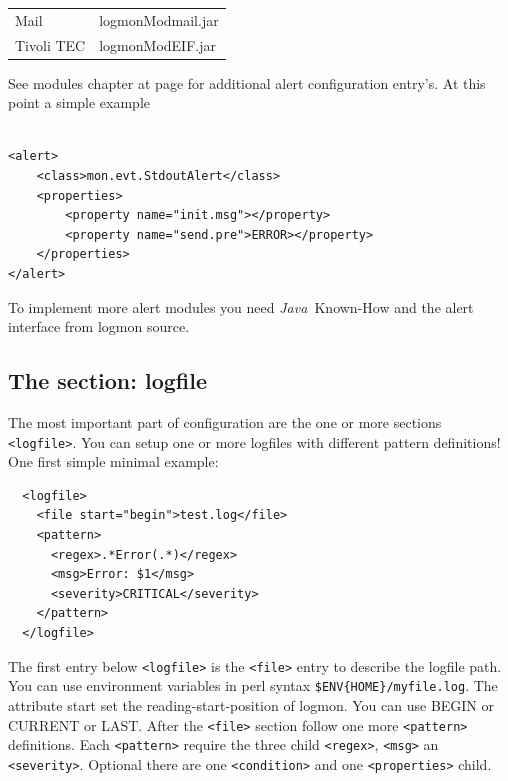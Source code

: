 \documentclass[11pt,a4paper]{article}
\newcommand{\java}{\textit{Java\ }}
\begin{document}
\bigskip
\begin{tabular}{ll}
  Mail 	     & logmonModmail.jar\\[1ex]
  Tivoli TEC & logmonModEIF.jar\\
\end{tabular}
\bigskip

See modules chapter at page \pageref{sec:modules} for additional alert
configuration entry's. At this point a simple example

\begin{samepage}
\begin{verbatim}

<alert>
    <class>mon.evt.StdoutAlert</class>
    <properties>
        <property name="init.msg"></property>
        <property name="send.pre">ERROR></property>
    </properties>
</alert>

\end{verbatim}
\end{samepage}

To implement more alert modules you need \java Known-How and the alert interface
from logmon source.

\subsection{The section: logfile}

The most important part of configuration are the one or more sections \verb#<logfile>#. You can
setup one or more logfiles with different pattern definitions! One first simple minimal example:

\begin{samepage}
\label{ex:logfile1}
\begin{verbatim}
  <logfile>
    <file start="begin">test.log</file>
    <pattern>
      <regex>.*Error(.*)</regex>
      <msg>Error: $1</msg>
      <severity>CRITICAL</severity>
    </pattern>
  </logfile>
\end{verbatim}
\end{samepage}

The first entry below \verb#<logfile># is the \verb#<file># entry to describe
the logfile path. You can use environment variables in perl syntax
\verb#$ENV{HOME}/myfile.log#. The attribute start set the reading-start-position
of logmon. You can use BEGIN or CURRENT or LAST.
After the \verb#<file># section
follow one more \verb#<pattern># definitions. Each \verb#<pattern># require the
three child \verb#<regex>#, \verb#<msg># an \verb#<severity>#. Optional there
are one \verb#<condition># and one \verb#<properties># child.
\end{document}
